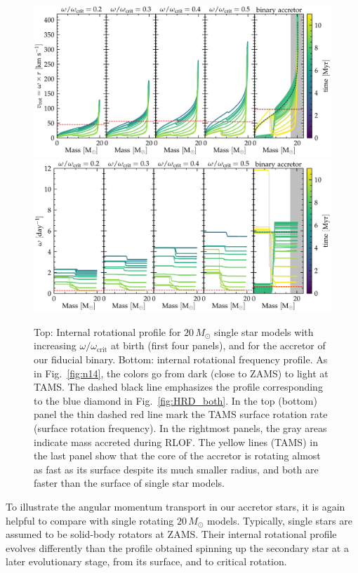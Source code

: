 \documentclass[twocolumn,twocolappendix,trackchanges]{aastex63}
\DeclareRobustCommand{\Figref}[1]{Fig.~\ref{#1}}
\begin{document}
\begin{figure}[tbp]
  \centering
  \includegraphics[width=\textwidth]{zeta_Rotational_struct}
  \includegraphics[width=\textwidth]{omega_struct}
  \caption{Top: Internal rotational profile for $20\,M_\odot$ single
    star models with increasing $\omega/\omega_\mathrm{crit}$ at birth
    (first four panels), and for the accretor of our fiducial
    binary. Bottom: internal rotational frequency profile. As in
    \Figref{fig:n14}, the colors go from dark (close to ZAMS) to light
    at TAMS. The dashed black line emphasizes the profile
    corresponding to the blue diamond in \Figref{fig:HRD_both}. In
    the top (bottom) panel the thin dashed red line mark the TAMS surface
    rotation rate (surface rotation frequency). In the rightmost panels, the gray areas indicate
    mass accreted during RLOF. The yellow lines (TAMS) in the last
    panel show that the core of the accretor is rotating almost as
    fast as its surface despite its much smaller radius, and both are
    faster than the surface of single star models.}
  \label{fig:struct_rot}
\end{figure}

To illustrate the angular momentum transport in our accretor stars, it
is again helpful to compare with single rotating $20\,M_\odot$
models. Typically, single stars are assumed to be solid-body rotators
at ZAMS. Their internal rotational profile evolves differently than
the profile obtained spinning up the secondary star at a later
evolutionary stage, from its surface, and to critical rotation.
\end{document}
